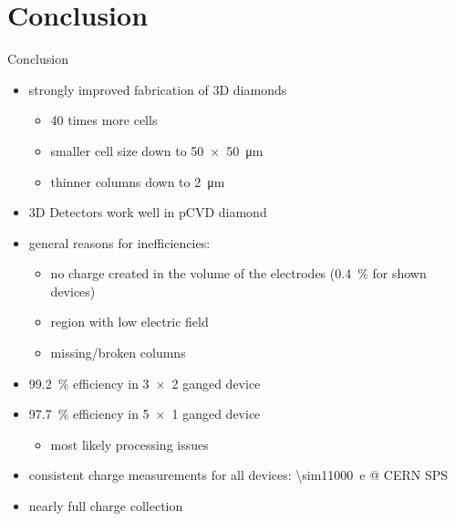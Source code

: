 \section{Conclusion}
\begin{frame}{Conclusion}

	\begin{minipage}[c][6.5cm]{\textwidth}
		\begin{itemize}\itemfill
			\item strongly improved fabrication of 3D diamonds
			\begin{itemize}
				\item 40 times more cells
				\item smaller cell size down to \SI{50x50}{\micro\meter}
				\item thinner columns down to \SI{2}{\micro\meter}\vspace*{2ex}
			\end{itemize}
			\item 3D Detectors work well in pCVD diamond
			\item general reasons for inefficiencies:
			\begin{itemize}
				\item no charge created in the volume of the electrodes (\SI{.4}{\%} for shown devices)
				\item region with low electric field
				\item missing/broken columns\vspace*{2ex}
			\end{itemize}
			\item \SI{99.2}{\%} efficiency in \SI{3x2}{} ganged device
			\item \SI{97.7}{\%} efficiency in \SI{5x1}{} ganged device
			\begin{itemize}
				\item most likely processing issues\vspace*{2ex}
			\end{itemize}
			\item consistent charge measurements for all devices: \SI{\sim11000}{e} @ CERN SPS
			\item nearly full charge collection
		\end{itemize}
	\end{minipage}
	
\end{frame}
